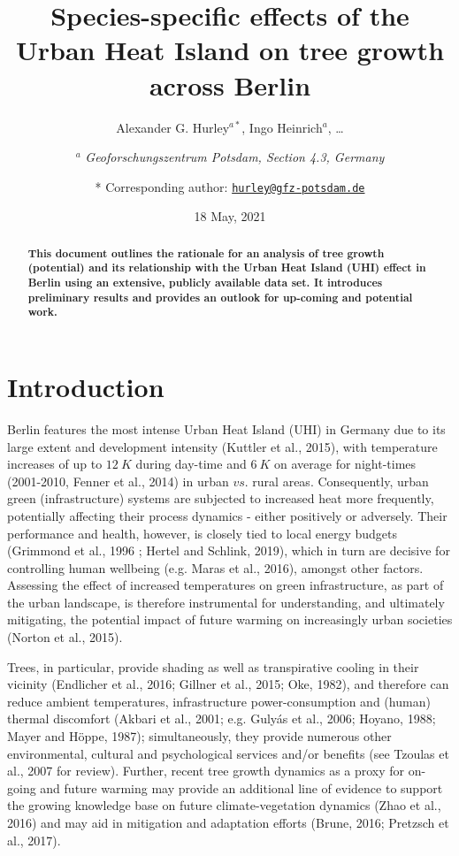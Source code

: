 \documentclass[
]{article}
\title{Species-specific effects of the Urban Heat Island on tree growth across Berlin}
\author{Alexander G. Hurley\(^{a *}\), Ingo Heinrich\(^a\), \ldots{} \and \(^a\) \emph{Geoforschungszentrum Potsdam, Section 4.3, Germany} \and * Corresponding author: \href{mailto:hurley@gfz-potsdam.de}{\nolinkurl{hurley@gfz-potsdam.de}}}
\date{18 May, 2021}
\begin{document}
\maketitle
\begin{abstract}
\textbf{This document outlines the rationale for an analysis of tree growth (potential) and its relationship with the Urban Heat Island (UHI) effect in Berlin using an extensive, publicly available data set. It introduces preliminary results and provides an outlook for up-coming and potential work.}
\end{abstract}

{
\setcounter{tocdepth}{2}
\tableofcontents
}
\hypertarget{sec:intro}{%
\section{Introduction}\label{sec:intro}}

Berlin features the most intense Urban Heat Island (UHI) in Germany due to its large extent and development intensity (Kuttler et al., 2015), with temperature increases of up to \(12~K\) during day-time and \(6~K\) on average for night-times (2001-2010, Fenner et al., 2014) in urban \(vs.\) rural areas.
Consequently, urban green (infrastructure) systems are subjected to increased heat more frequently, potentially affecting their process dynamics - either positively or adversely.
Their performance and health, however, is closely tied to local energy budgets (Grimmond et al., 1996 ; Hertel and Schlink, 2019), which in turn are decisive for controlling human wellbeing (e.g. Maras et al., 2016), amongst other factors.
Assessing the effect of increased temperatures on green infrastructure, as part of the urban landscape, is therefore instrumental for understanding, and ultimately mitigating, the potential impact of future warming on increasingly urban societies (Norton et al., 2015).

Trees, in particular, provide shading as well as transpirative cooling in their vicinity (Endlicher et al., 2016; Gillner et al., 2015; Oke, 1982), and therefore can reduce ambient temperatures, infrastructure power-consumption and (human) thermal discomfort (Akbari et al., 2001; e.g. Gulyás et al., 2006; Hoyano, 1988; Mayer and Höppe, 1987);
simultaneously, they provide numerous other environmental, cultural and psychological services and/or benefits (see Tzoulas et al., 2007 for review).
Further, recent tree growth dynamics as a proxy for on-going and future warming may provide an additional line of evidence to support the growing knowledge base on future climate-vegetation dynamics (Zhao et al., 2016) and may aid in mitigation and adaptation efforts (Brune, 2016; Pretzsch et al., 2017).
\end{document}
